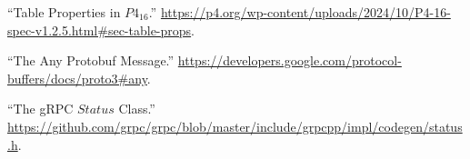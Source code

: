 \documentclass[11pt]{article}
\begin{document}
{{\begin{thebibliography}{45}
\mdbibitemlabel{{}[36]}\textquotedblleft{}Table Properties in $P4_{16}$.\textquotedblright{} \href{https://p4.org/wp-content/uploads/2024/10/P4-16-spec-v1.2.5.html\%23sec-table-props}{{\ttfamily https://\hspace{0pt}p4.\hspace{0pt}org/\hspace{0pt}wp-\hspace{0pt}content/\hspace{0pt}uploads/\hspace{0pt}2024/\hspace{0pt}10/\hspace{0pt}P4-\hspace{0pt}16-\hspace{0pt}spec-\hspace{0pt}v1.\hspace{0pt}2.\hspace{0pt}5.\hspace{0pt}html\#\hspace{0pt}sec-\hspace{0pt}table-\hspace{0pt}props}}.\label{p4tableproperties}%

\mdbibitemlabel{{}[37]}\textquotedblleft{}The Any Protobuf Message.\textquotedblright{} \href{https://developers.google.com/protocol-buffers/docs/proto3\%23any}{{\ttfamily https://\hspace{0pt}developers.\hspace{0pt}google.\hspace{0pt}com/\hspace{0pt}protocol-\hspace{0pt}buffers/\hspace{0pt}docs/\hspace{0pt}proto3\#\hspace{0pt}any}}.\label{protoany}%

\mdbibitemlabel{{}[38]}\textquotedblleft{}The gRPC $Status$ Class.\textquotedblright{} \href{https://github.com/grpc/grpc/blob/master/include/grpcpp/impl/codegen/status.h}{{\ttfamily https://\hspace{0pt}github.\hspace{0pt}com/\hspace{0pt}grpc/\hspace{0pt}grpc/\hspace{0pt}blob/\hspace{0pt}master/\hspace{0pt}include/\hspace{0pt}grpcpp/\hspace{0pt}impl/\hspace{0pt}codegen/\hspace{0pt}status.\hspace{0pt}h}}.\label{grpcstatus}%


\end{thebibliography}}}
\end{document}
